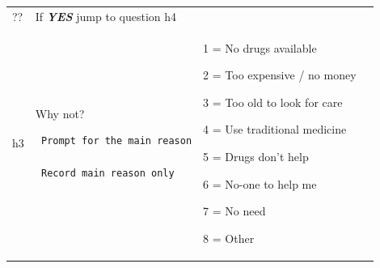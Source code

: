\documentclass[12pt,a4paper]{book}
\theoremstyle{definition}
\theoremstyle{definition}
\theoremstyle{definition}
\theoremstyle{remark}
\begin{document}
\begin{longtable}[]{@{}llll@{}}
\begin{minipage}[t]{0.09\columnwidth}
??\strut
\end{minipage} & \begin{minipage}[t]{0.41\columnwidth}\raggedright
If \textbf{\emph{YES}} jump to question h4\strut
\end{minipage} & \begin{minipage}[t]{0.25\columnwidth}\raggedright
\strut
\end{minipage} & \begin{minipage}[t]{0.13\columnwidth}\raggedright
\strut
\end{minipage}\tabularnewline
\begin{minipage}[t]{0.24\columnwidth}\raggedright
h3\strut
\end{minipage} & \begin{minipage}[t]{0.24\columnwidth}\raggedright
Why not?

\begin{verbatim}
 Prompt for the main reason

 Record main reason only
\end{verbatim}
\strut
\end{minipage} & \begin{minipage}[t]{0.24\columnwidth}\raggedright
1 = No drugs available

2 = Too expensive / no money

3 = Too old to look for care

4 = Use traditional medicine

5 = Drugs don't help

6 = No-one to help me

7 = No need

8 = Other


\end{minipage}
\end{longtable}
\end{document}
